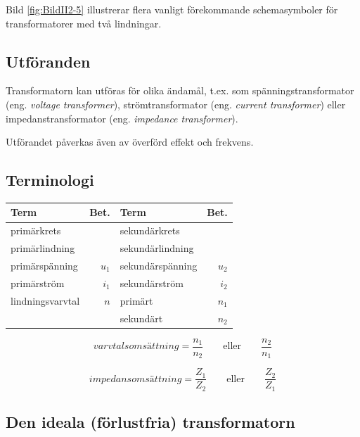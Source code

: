 Bild \ref{fig:BildII2-5} illustrerar flera vanligt förekommande schemasymboler
för transformatorer med två lindningar.

\subsection{Utföranden}

Transformatorn kan utföras för olika ändamål, t.ex. som
spänningstransformator (eng. \emph{voltage transformer}),
strömtransformator (eng. \emph{current transformer}) eller
impedanstransformator (eng. \emph{impedance transformer}).

Utförandet påverkas även av överförd effekt och frekvens.

\subsection{Terminologi}

\begin{tabular}{lr|lr}
	Term             &    Bet. & Term             &    Bet. \\ \hline
	primärkrets      &         & sekundärkrets    &  \\
	primärlindning   &         & sekundärlindning &  \\
	primärspänning   & \(u_1\) & sekundärspänning & \(u_2\) \\
	primärström      & \(i_1\) & sekundärström    & \(i_2\) \\
	lindningsvarvtal &   \(n\) & primärt          & \(n_1\) \\
	                 &         & sekundärt        & \(n_2\)
\end{tabular}

\[varvtalsomsättning = \dfrac{n_1}{n_2} \qquad 
\mathrm{eller} \qquad \dfrac{n_2}{n_1} \]

\[impedansomsättning = \dfrac{Z_1}{Z_2} \qquad 
\mathrm{eller} \qquad \dfrac{Z_2}{Z_1}\]

\subsection{Den ideala (förlustfria) transformatorn}

